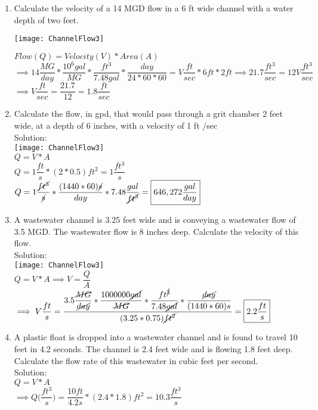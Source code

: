 \begin{enumerate}[1.]
\item Calculate the velocity of a 14 MGD flow in a 6 ft wide channel with a water depth of two feet.\\
\begin{center}
\texttt{[image: ChannelFlow3]}
\end{center}
$Flow (Q) = Velocity (V) * Area (A)$\\
$\implies 14 \dfrac{MG}{day}* \dfrac{10^6 gal}{MG} * \dfrac{ft^3}{7.48 gal}*\dfrac{day}{24*60*60} = V \dfrac{ft}{sec}* 6 ft * 2 ft \implies 21.7 \dfrac{ft^3}{sec}= 12V\dfrac{ft^3}{sec}$\\
$\implies V \dfrac{ft}{sec}= \dfrac{21.7}{12}= \boxed{1.8\dfrac{ft}{sec}}$\\

\item Calculate the flow, in gpd, that would pass through a grit chamber 2 feet wide, at a depth of 6 inches, with a velocity of 1 ft /sec\\
Solution:\\
\texttt{[image: ChannelFlow3]}\\
$Q=V*A$\\
$Q=1\dfrac{ft}{s}*(2*0.5)ft^2=1\dfrac{ft^3}{s}$\\
$Q=1\dfrac{\cancel{ft^3}}{\cancel{s}}*\dfrac{(1440*60)\cancel{s}}{day}*7.48\dfrac{gal}{\cancel{ft^3}}=\boxed{646,272\dfrac{gal}{day}}$
\vspace{0.5cm}
\item A wastewater channel is 3.25 feet wide and is conveying a wastewater flow of 3.5 MGD. The wastewater flow is 8 inches deep. Calculate the velocity of this flow.\\
Solution:\\
\texttt{[image: ChannelFlow3]}\\
$Q=V*A \implies V=\dfrac{Q}{A}$\\
$\implies V\dfrac{ft}{s}=\dfrac{3.5\dfrac{\cancel{MG}}{\cancel{day}}*\dfrac{1000000\cancel{gal}}{\cancel{MG}}*\dfrac{ft^{\cancel{3}}}{7.48\cancel{gal}}*\dfrac{\cancel{day}}{(1440*60)s}}{(3.25*0.75)\cancel{ft^2}}=\boxed{2.2\dfrac{ft}{s}}$
\vspace{0.5cm}
\item A plastic float is dropped into a wastewater channel and is found to travel 10 feet in 4.2 seconds. The channel is 2.4 feet wide and is flowing 1.8 feet deep. Calculate the flow rate of this wastewater in cubic feet per second.\\
Solution:\\
$Q=V*A$\\
$\implies Q\Big(\dfrac{ft^3}{s}\Big)=\dfrac{10ft}{4.2s}*(2.4*1.8)ft^2=\boxed{10.3\dfrac{ft^3}{s}}$
\end{enumerate}

